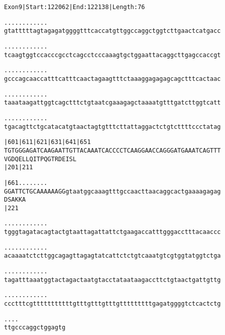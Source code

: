 \documentclass{article}
\begin{document}
\begin{alltt}
Exon 9 | Start: 122062 | End: 122138 | Length: 76

.    .    .    .    .    .    .    .    .    .    .    .    
gtatttttagtagagatggggtttcaccatgttggccaggctggtcttgaactcatgacc

.    .    .    .    .    .    .    .    .    .    .    .    
tcaagtggtccacccgcctcagcctcccaaagtgctggaattacaggcttgagccaccgt

.    .    .    .    .    .    .    .    .    .    .    .    
gcccagcaaccatttcatttcaactagaagtttctaaaggagagagcagctttcactaac

.    .    .    .    .    .    .    .    .    .    .    .    
taaataagattggtcagctttctgtaatcgaaagagctaaaatgtttgatcttggtcatt

.    .    .    .    .    .    .    .    .    .    .    .    
tgacagttctgcatacatgtaactagtgtttcttattaggactctgtcttttccctatag

       |601      |611      |621      |631      |641      |651
TGTGGGAGATCAAGAATTGTTACAAATCACCCCTCAAGGAACCAGGGATGAAATCAGTTT
 V  G  D  Q  E  L  L  Q  I  T  P  Q  G  T  R  D  E  I  S  L 
       |201                          |211                   

       |661          .    .    .    .    .    .    .    .   
GGATTCTGCAAAAAAGGgtaatggcaaagtttgccaacttaacaggcactgaaaagagag
 D  S  A  K  K  A                                           
       |221                                                 

 .    .    .    .    .    .    .    .    .    .    .    .   
tgggtagatacagtactgtaattagattattctgaagaccatttgggacctttacaaccc

 .    .    .    .    .    .    .    .    .    .    .    .   
acaaaatctcttggcagagttagagtatcattctctgtcaaatgtcgtggtatggtctga

 .    .    .    .    .    .    .    .    .    .    .    .   
tagatttaaatggtactagactaatgtacctataataagaccttctgtaactgattgttg

 .    .    .    .    .    .    .    .    .    .    .    .   
ccctttcgtttttttttttgtttgtttgtttgtttttttttgagatggggtctcactctg

 .    .    .    .
ttgcccaggctggagtg
\end{alltt}
\newpage
\end{document}
